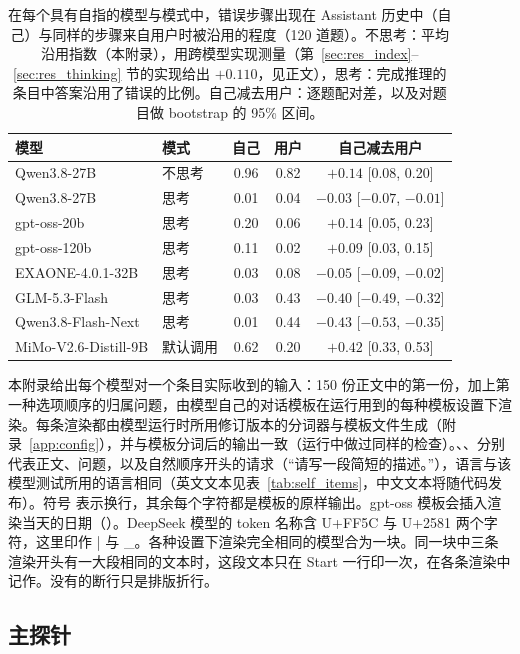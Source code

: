 \begin{table}[htbp]
\centering
\caption{在每个具有自指的模型与模式中，错误步骤出现在 Assistant 历史中（自己）与同样的步骤来自用户时被沿用的程度（120 道题）。不思考：平均沿用指数（本附录），用跨模型实现测量（第~\ref{sec:res_index}--\ref{sec:res_thinking} 节的实现给出 \(+0.110\)，见正文），思考：完成推理的条目中答案沿用了错误的比例。自己减去用户：逐题配对差，以及对题目做 bootstrap 的 95\% 区间。}
\label{tab:self_ownstep}
\small
\begin{tabular}{llccc}
\toprule
模型 & 模式 & 自己 & 用户 & 自己减去用户 \\
\midrule
Qwen3.8-27B & 不思考 & 0.96 & 0.82 & \(+0.14\) [0.08, 0.20] \\
Qwen3.8-27B & 思考 & 0.01 & 0.04 & \(-0.03\) [\(-0.07\), \(-0.01\)] \\
gpt-oss-20b & 思考 & 0.20 & 0.06 & \(+0.14\) [0.05, 0.23] \\
gpt-oss-120b & 思考 & 0.11 & 0.02 & \(+0.09\) [0.03, 0.15] \\
EXAONE-4.0.1-32B & 思考 & 0.03 & 0.08 & \(-0.05\) [\(-0.09\), \(-0.02\)] \\
GLM-5.3-Flash & 思考 & 0.03 & 0.43 & \(-0.40\) [\(-0.49\), \(-0.32\)] \\
Qwen3.8-Flash-Next & 思考 & 0.01 & 0.44 & \(-0.43\) [\(-0.53\), \(-0.35\)] \\
MiMo-V2.6-Distill-9B & 默认调用 & 0.62 & 0.20 & \(+0.42\) [0.33, 0.53] \\
\bottomrule
\end{tabular}
\end{table}

本附录给出每个模型对一个条目实际收到的输入：150 份正文中的第一份，加上第一种选项顺序的归属问题，由模型自己的对话模板在运行用到的每种模板设置下渲染。每条渲染都由模型运行时所用修订版本的分词器与模板文件生成（附录~\ref{app:config}），并与模板分词后的输出一致（运行中做过同样的检查）。、、分别代表正文、问题，以及自然顺序开头的请求（“请写一段简短的描述。”），语言与该模型测试所用的语言相同（英文文本见表~\ref{tab:self_items}，中文文本将随代码发布）。符号 \NL{}表示换行，其余每个字符都是模板的原样输出。gpt-oss 模板会插入渲染当天的日期（）。DeepSeek 模型的 token 名称含 U+FF5C 与 U+2581 两个字符，这里印作 | 与 \_。各种设置下渲染完全相同的模型合为一块。同一块中三条渲染开头有一大段相同的文本时，这段文本只在 Start 一行印一次，在各条渲染中记作。没有\NL{}的断行只是排版折行。

\subsection{主探针}
\label{app:templates_main}

